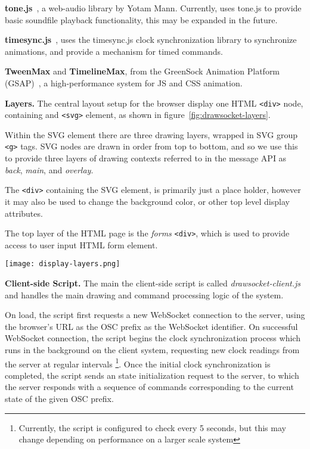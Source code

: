 \textbf{tone.js}~\cite{mann2015interactive}, a web-audio library by Yotam Mann. Currently, \drawsocket uses tone.js to provide basic soundfile playback functionality, this may be expanded in the future.

\textbf{timesync.js}~\cite{timesync}, \drawsocket uses the timesync.js clock synchronization library to synchronize animations, and provide a mechanism for timed commands.

 \textbf{TweenMax} and \textbf{TimelineMax}, from the GreenSock Animation Platform (GSAP)~\cite{gsap}, a high-performance system for JS and CSS animation.

\medskip
\noindent
\textbf{Layers.}
The central layout setup for the browser display one HTML \texttt{<div>} node, containing and \texttt{<svg>} element, as shown in figure~\ref{fig:drawsocket-layers}.

Within the SVG element there are three drawing layers, wrapped in SVG group \texttt{<g>} tags.
SVG nodes are drawn in order from top to bottom, and so we use this to provide three layers of drawing contexts referred to in the message API as \textit{back}, \textit{main}, and \textit{overlay}.

The \texttt{<div>} containing the SVG element, is primarily just a place holder, however it may also be used to change the background color, or other top level display attributes.

The top layer of the HTML page is the \textit{forms} \texttt{<div>}, which is used to provide access to user input HTML form element.

\begin{figure*}[]
\centering
\texttt{[image: display-layers.png]}
\caption{\drawsocket display layers. 
\label{fig:drawsocket-layers}}
\end{figure*}

\medskip
\noindent
\textbf{Client-side Script.} 
The main the client-side script is called \textit{drawsocket-client.js} and handles the main drawing and command processing logic of the system.

On load, the script first requests a new WebSocket connection to the server, using the browser's URL as the OSC prefix as the WebSocket identifier. On successful WebSocket connection, the script begins the clock synchronization process which runs in the background on the client system, requesting new clock readings from the server at regular intervals \footnote{Currently, the script is configured to check every 5 seconds, but this may change depending on performance on a larger scale system}. Once the initial clock synchronization is completed, the script sends an state initialization request to the server, to which the server responds with a sequence of commands corresponding to the current state of the given OSC prefix.

